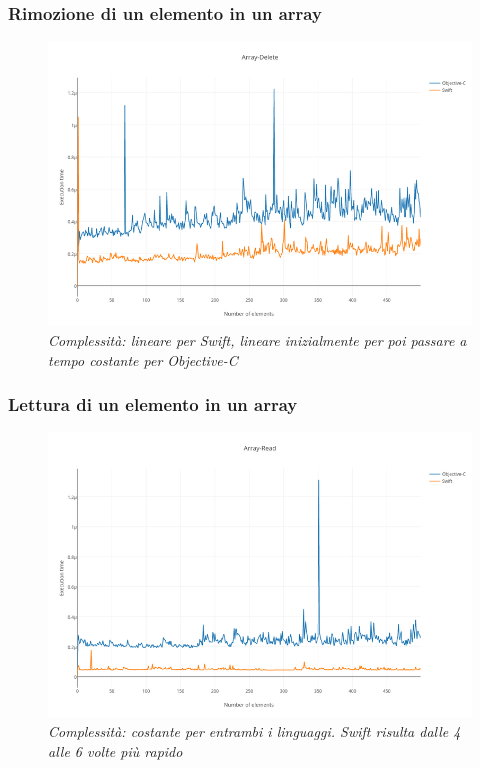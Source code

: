 \subsubsection{Rimozione di un elemento in un array}
\begin{figure}[H]
      \centering
      \includegraphics[scale=0.50]{immagini/array_delete.png}
            \vspace{0.8cm}
            \caption{\textit{Complessità: lineare per Swift, lineare inizialmente per poi passare a tempo costante per Objective-C}}
\end{figure}
\subsubsection{Lettura di un elemento in un array}
\begin{figure}[H]
      \centering
      \includegraphics[scale=0.50]{immagini/array_read.png}
            \vspace{0.8cm}
            \caption{\textit{Complessità: costante per entrambi i linguaggi. Swift risulta dalle 4 alle 6 volte più rapido}}
\end{figure}

